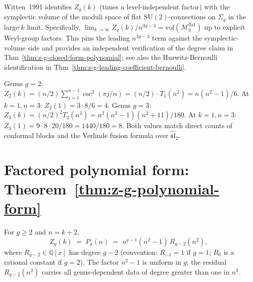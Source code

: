 \begin{remark}
\label{rem:witten-normalisation}
Witten~1991 identifies $Z_g(k)$ (times a level-independent factor) with the
symplectic volume of the moduli space of flat $\mathrm{SU}(2)$-connections
on $\Sigma_g$ in the large-$k$ limit. Specifically,
$\lim_{k\to\infty} Z_g(k) / n^{3g-3} = \mathrm{vol}(\mathcal{M}_g^{\mathrm{flat}})$
up to explicit Weyl-group factors. This pins the leading $n^{3g-3}$ term
against the symplectic-volume side and provides an independent verification of
the degree claim in Thm~\ref{thm:z-g-closed-form-polynomial}; see also the
Hurwitz-Bernoulli identification in Thm~\ref{thm:z-g-leading-coefficient-bernoulli}.
\end{remark}

\begin{remark}
\label{rem:low-genus}
Genus $g=2$: $Z_2(k) = (n/2) \sum_{j=1}^{n-1} \csc^2(\pi j/n) = (n/2)\cdot T_1(n^2) = n(n^2-1)/6$.
At $k=1, n=3$: $Z_2(1) = 3\cdot 8/6 = 4$. Genus $g=3$: $Z_3(k) = (n/2)^2 T_2(n^2) = n^2(n^2-1)(n^2+11)/180$.
At $k=1, n=3$: $Z_3(1) = 9\cdot 8\cdot 20/180 = 1440/180 = 8$. Both values match direct
counts of conformal blocks and the Verlinde fusion formula over $\widehat{\mathfrak{sl}}_2$.
\end{remark}

\section{Factored polynomial form: Theorem~\ref{thm:z-g-polynomial-form}}

\begin{theorem}
\label{thm:z-g-polynomial-form}
\ClaimStatusProvedHere
For $g \ge 2$ and $n = k+2$,
\begin{equation}
\label{eq:pg-factored}
Z_g(k) \;=\; P_g(n) \;=\; n^{g-1}(n^2-1)\,R_{g-2}(n^2),
\end{equation}
where $R_{g-2} \in \mathbb{Q}[x]$ has degree $g-2$ (convention: $R_{-1} = 1$ if
$g=1$; $R_0$ is a rational constant if $g=2$). The factor $n^2 - 1$ is uniform
in $g$; the residual $R_{g-2}(n^2)$ carries all genus-dependent data of degree
greater than one in $n^2$.
\end{theorem}

